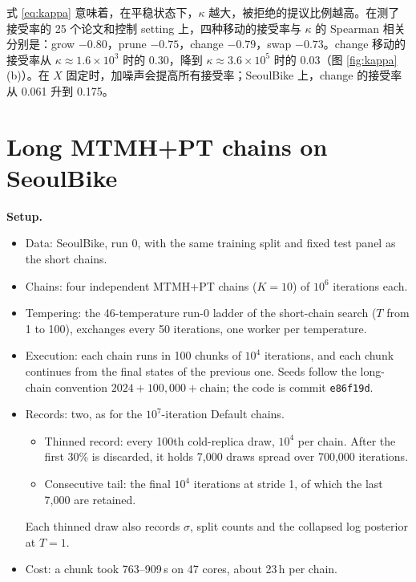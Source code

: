 \documentclass[11pt]{article}
\newcommand{\zhfont}{}
\begin{document}
\begin{zhbox}
式 \eqref{eq:kappa} 意味着，在平稳状态下，$\kappa$ 越大，被拒绝的提议比例越高。在测了接受率的 25 个论文和控制 setting 上，四种移动的接受率与 $\kappa$ 的 Spearman 相关分别是：grow $-0.80$，prune $-0.75$，change $-0.79$，swap $-0.73$。change 移动的接受率从 $\kappa\approx1.6\times10^3$ 时的 0.30，降到 $\kappa\approx3.6\times10^5$ 时的 0.03（图 \ref{fig:kappa}(b)）。在 $X$ 固定时，加噪声会提高所有接受率；SeoulBike 上，change 的接受率从 0.061 升到 0.175。
\end{zhbox}


\section{Long MTMH+PT chains on SeoulBike\quad{\zhfont SeoulBike 上的长 MTMH+PT 链}}
\label{sec:long-pt}


\textbf{Setup.}
\begin{itemize}
\item Data: SeoulBike, run 0, with the same training split and fixed test panel as the short chains.
\item Chains: four independent MTMH+PT chains ($K=10$) of $10^6$ iterations each.
\item Tempering: the 46-temperature run-0 ladder of the short-chain search ($T$ from 1 to 100), exchanges every 50 iterations, one worker per temperature.
\item Execution: each chain runs in 100 chunks of $10^4$ iterations, and each chunk continues from the final states of the previous one. Seeds follow the long-chain convention $2024+100{,}000+\text{chain}$; the code is commit \texttt{e86f19d}.
\item Records: two, as for the $10^7$-iteration Default chains.
\begin{itemize}
\item Thinned record: every 100th cold-replica draw, $10^4$ per chain. After the first 30\% is discarded, it holds 7,000 draws spread over 700,000 iterations.
\item Consecutive tail: the final $10^4$ iterations at stride 1, of which the last 7,000 are retained.
\end{itemize}
Each thinned draw also records $\sigma$, split counts and the collapsed log posterior at $T=1$.
\item Cost: a chunk took 763--909\,s on 47 cores, about 23\,h per chain.
\end{itemize}
\end{document}
